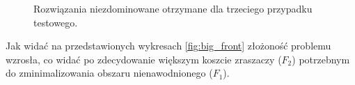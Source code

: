 \documentclass[twoside]{iisthesis}
\begin{document}
\begin{figure}\centering
{}
    \hfill
{}
    \hfill
{}
\caption{Rozwiązania niezdominowane otrzymane dla trzeciego przypadku testowego.}
    \label{fig:big_front}
\end{figure}
Jak widać na przedstawionych wykresach  \eqref{fig:big_front} złożoność problemu wzrosła, co widać po zdecydowanie większym koszcie zraszaczy ($F_{2}$) potrzebnym do zminimalizowania obszaru nienawodnionego ($F_{1}$).
\end{document}
